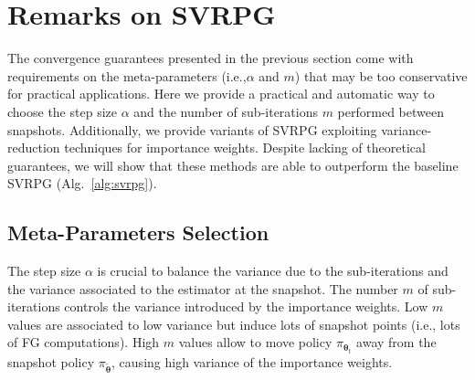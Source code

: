 \documentclass{article}
\makeatletter
\theoremstyle{remark}
\theoremstyle{definition}
\DeclareRobustCommand{\ie}{i.e.,\@\xspace}
\newcommand{\vtheta}{\boldsymbol{\theta}}
\newcommand{\wt}[1]{\widetilde{#1}}
\makeatother
\begin{document}
\section{Remarks on SVRPG}
The convergence guarantees presented in the previous section come with requirements on the meta-parameters (\ie $\alpha$ and $m$) that may be too conservative for practical applications.
Here we provide a practical and automatic way to choose the step size $\alpha$ and the number of sub-iterations $m$ performed between snapshots.
Additionally, we provide variants of SVRPG exploiting variance-reduction techniques for importance weights. Despite lacking of theoretical guarantees, we will show that these methods are able to outperform the baseline SVRPG (Alg.~\ref{alg:svrpg}).

\subsection{Meta-Parameters Selection}\label{sec:stopping}
The step size $\alpha$ is crucial to balance the variance due to the sub-iterations and the variance associated to the estimator at the snapshot.
The number $m$ of sub-iterations controls the variance introduced by the importance weights. Low $m$ values are associated to low variance but induce lots of snapshot points (\ie lots of FG computations). High $m$ values allow to move policy $\pi_{\vtheta_t}$ away from the snapshot policy $\pi_{\wt{\vtheta}}$, causing high variance of the importance weights.
\end{document}
